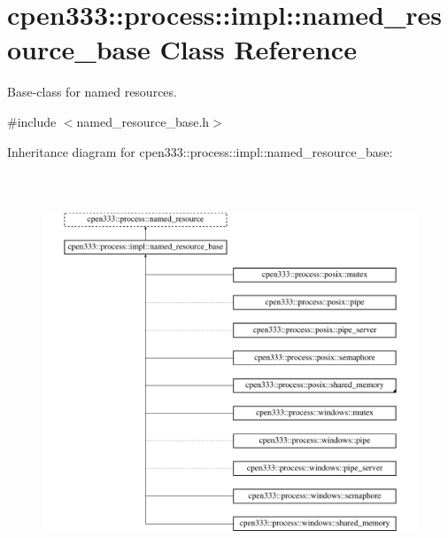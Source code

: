 \hypertarget{classcpen333_1_1process_1_1impl_1_1named__resource__base}{}\section{cpen333\+:\+:process\+:\+:impl\+:\+:named\+\_\+resource\+\_\+base Class Reference}
\label{classcpen333_1_1process_1_1impl_1_1named__resource__base}


Base-\/class for named resources.  




{\ttfamily \#include $<$named\+\_\+resource\+\_\+base.\+h$>$}

Inheritance diagram for cpen333\+:\+:process\+:\+:impl\+:\+:named\+\_\+resource\+\_\+base\+:\begin{figure}[H]
\begin{center}
\leavevmode
\includegraphics[height=11.872791cm]{classcpen333_1_1process_1_1impl_1_1named__resource__base}
\end{center}
\end{figure}
